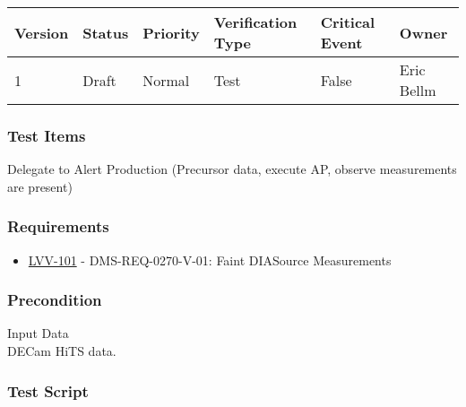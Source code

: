 \begin{longtable}[]{@{}llllll@{}}
\toprule
Version & Status & Priority & Verification Type & Critical Event &
Owner\tabularnewline
\midrule
\endhead
1 & Draft & Normal & Test & False & Eric Bellm\tabularnewline
\bottomrule
\end{longtable}

\hypertarget{test-items-26}{%
\subsubsection{Test Items}\label{test-items-26}}

Delegate to Alert Production (Precursor data, execute AP, observe
measurements are present)

\hypertarget{requirements-27}{%
\subsubsection{Requirements}\label{requirements-27}}

\begin{itemize}
\tightlist
\item
  \href{https://jira.lsstcorp.org/browse/LVV-101}{LVV-101} -
  DMS-REQ-0270-V-01: Faint DIASource Measurements
\end{itemize}

\hypertarget{precondition-1}{%
\subsubsection{Precondition}\label{precondition-1}}

Input Data\\
\hspace*{0.333em}DECam HiTS data.

\hypertarget{test-script-27}{%
\subsubsection{Test Script}\label{test-script-27}}

